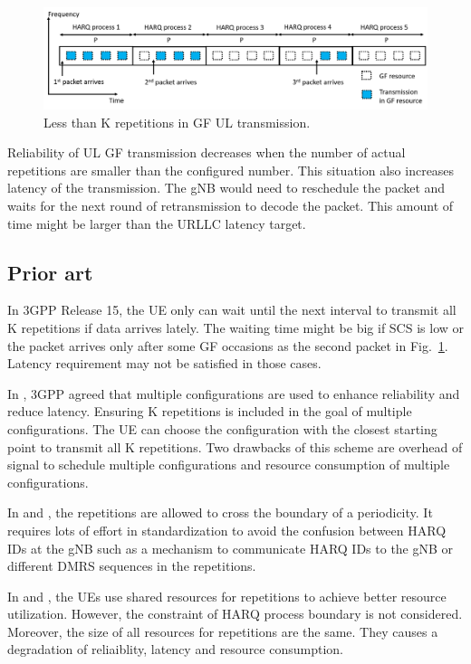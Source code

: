 \documentclass{ieeeaccess}
\begin{document}
\begin{figure}[htbp]
\centerline{\includegraphics[scale=0.27]{fig4.png}}
\caption{Less than K repetitions in GF UL transmission.}
\label{fig4}
\vspace{-3mm}
\end{figure}

Reliability of UL GF transmission decreases when the number of actual repetitions are smaller than the configured number. This situation also increases latency of the transmission. The gNB would need to reschedule the packet and waits for the next round of retransmission to decode the packet. This amount of time might be larger than the URLLC latency target.

\subsection{Prior art}
In 3GPP Release 15, the UE only can wait until the next interval to transmit all K repetitions if data arrives lately. The waiting time might be big if SCS is low or the packet arrives only after some GF occasions as the second packet in Fig.~\ref{fig4}. Latency requirement may not be satisfied in those cases.

In \cite{ref7}, 3GPP agreed that multiple configurations are used to enhance reliability and reduce latency. Ensuring K repetitions is included in the goal of multiple configurations. The UE can choose the configuration with the closest starting point to transmit all K repetitions. Two drawbacks of this scheme are overhead of signal to schedule multiple configurations and resource consumption of multiple configurations.

In \cite{ref8} and \cite{ref9}, the repetitions are allowed to cross the boundary of a periodicity. It requires lots of effort in standardization to avoid the confusion between HARQ IDs at the gNB such as a mechanism to communicate HARQ IDs to the gNB or different DMRS sequences in the repetitions.

In \cite{ref10} and \cite{ref11}, the UEs use shared resources for repetitions to achieve better resource utilization. However, the constraint of HARQ process boundary is not considered. Moreover, the size of all resources for repetitions are the same. They causes a degradation of reliaiblity, latency and resource consumption.
\end{document}
